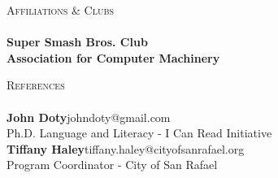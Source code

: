 \documentclass[a4paper]{article}
\newcommand{\lineunder} {
    \vspace*{-8pt} \\
    \hspace*{-18pt} \hrulefill \\
}
\newcommand{\header} [1] {
    {\hspace*{-18pt}\vspace*{6pt} \textsc{#1}}
    \vspace*{-6pt} \lineunder
}
\begin{document}
\header{Affiliations \& Clubs}

\vspace*{2mm}
\textbf{Super Smash Bros. Club}\\

\vspace*{2mm}
\textbf{Association for Computer Machinery}\\

\vspace*{2mm}

\header{References}
\textbf{John Doty}\hfill johndoty@gmail.com\\
Ph.D. Language and Literacy - I Can Read Initiative\\
\vspace{3mm}
\textbf{Tiffany Haley}\hfill tiffany.haley@cityofsanrafael.org\\
Program Coordinator - City of San Rafael\\
\vspace{3mm}
\end{document}
